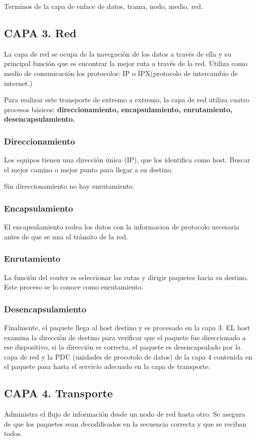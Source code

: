 \documentclass[letterpaper,12pt]{article}
\begin{document}
\begin{sloppypar}
Terminos de la capa de enlace de datos, trama, nodo, medio, red.

\subsection{CAPA 3. Red}
La capa de red se ocupa de la navegación de los datos a través de ella y su principal función que es encontrar la mejor ruta a través de la red. Utiliza como medio de comunicación los protocolos:  IP o IPX(protocolo de intercambio de internet.)

Para realizar este transporte de extremo a extremo, la capa de red utiliza cuatro procesos básicos: \textbf{direccionamiento, encapsulamiento, enrutamiento, desencapsulamiento. }

\subsubsection{Direccionamiento}
Los equipos tienen una dirección única (IP), que los identifica como host. 
Buscar el mejor camino o mejor punto para llegar a su destino. 


Sin direccionamiento no hay enrutamiento.

\subsubsection{Encapsulamiento}
El encapsulamiento rodea los datos con la informacion de protocolo necesaria antes de que se una al tránsito de la red.

\subsubsection{Enrutamiento}
La función del router es seleccionar las rutas y dirigir paquetes hacia su destino. Este proceso se lo conoce como enrutamiento. 
\subsubsection{Desencapsulamiento}
Finalmente, el paquete llega al host destino y es procesado en la capa 3. EL host examina la dirección de destino para verificar que el paquete fue direccionado a ese dispositivo, si la dirección es correcta, el paquete es desencapsulado por la capa de red y la PDU (unidades de procotolo de datos) de la capa 4 contenida en el paquete pasa hasta el servicio adecuado en la capa de transporte.

\subsection{CAPA 4. Transporte}
Administra el flujo de información desde un nodo de red hasta otro. Se asegura de que los paquetes sean decodificados en la secuencia correcta y que se reciban todos.


\end{sloppypar}
\end{document}
